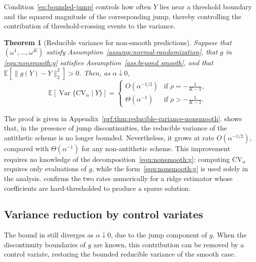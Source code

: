 \documentclass[12pt]{article}
\newtheorem{theorem}{Theorem}[section]
\DeclareMathOperator{\Var}{Var}
\def\E{\mathbb{E}}
\theoremstyle{general}
\newcommand{\cv}{{\mathrm{CV}}}
\begin{document}
Condition~\eqref{eq:bounded-jump} controls how often \(Y\) lies near a threshold boundary and the squared magnitude of the corresponding jump, thereby controlling the contribution of threshold-crossing events to the variance.

\begin{theorem}[Reducible variance for non-smooth predictions]
\label{thm:reducible-variance-nonsmooth}
Suppose that $(\omega^1,\ldots,\omega^K)$ satisfy Assumption~\ref{assump:normal-randomization}, that $g$ in \eqref{equ:nonsmooth:g} satisfies Assumption~\ref{ass:beyond smooth}, and that $\E[\|g(Y) - Y\|_2^2 ] > 0$.
Then, as $\alpha \downarrow 0$,
\[
\E\left[
\Var\{\cv_{\alpha}\mid Y\}
\right]= \begin{cases} 
O(\alpha^{-1/2}) & \text{if } \rho=-\frac{1}{K-1},\\[2pt]
\Theta(\alpha^{-1}) & \text{if } \rho>-\frac{1}{K-1}.
\end{cases}
\]
\end{theorem}

The proof is given in Appendix~\ref{prf:thm:reducible-variance-nonsmooth}.  shows that, in the presence of jump discontinuities, the reducible variance of the antithetic scheme is no longer bounded. Nevertheless, it grows at rate \(O(\alpha^{-1/2})\), compared with \(\Theta(\alpha^{-1})\) for any non-antithetic scheme. This improvement requires no knowledge of the decomposition~\eqref{equ:nonsmooth:g}: computing \(\cv_\alpha\) requires only evaluations of \(g\), while the form~\eqref{equ:nonsmooth:g} is used solely in the analysis.  confirms the two rates numerically for a ridge estimator whose coefficients are hard-thresholded to produce a sparse solution.

\subsection{Variance reduction by control variates}
\label{sec: control var}

The bound in  still diverges as $\alpha\downarrow0$, due to the jump component of $g$. When the discontinuity boundaries of $g$ are known, this contribution can be removed by a control variate, restoring the bounded reducible variance of the smooth case.
\end{document}
